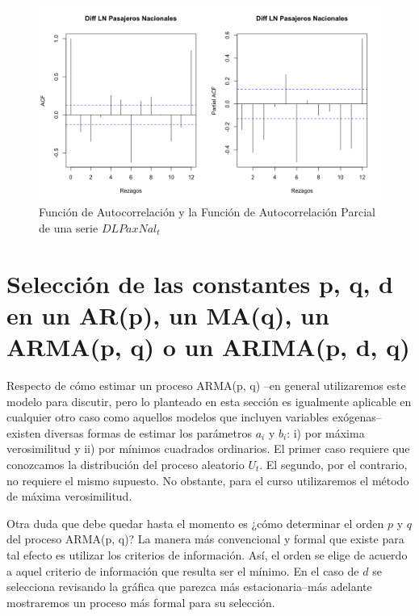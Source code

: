 \documentclass[
]{book}
\begin{document}
\begin{figure}

{\centering \includegraphics[width=0.95\linewidth]{Plots/G_ACF_PACF} 

}

\caption{Función de Autocorrelación y la Función de Autocorrelación Parcial de una serie $DLPaxNal_t$}\label{fig:fig414}
\end{figure}

\hypertarget{selecciuxf3n-de-las-constantes-p-q-d-en-un-arp-un-maq-un-armap-q-o-un-arimap-d-q}{%
\section{Selección de las constantes p, q, d en un AR(p), un MA(q), un ARMA(p, q) o un ARIMA(p, d, q)}\label{selecciuxf3n-de-las-constantes-p-q-d-en-un-arp-un-maq-un-armap-q-o-un-arimap-d-q}}

Respecto de cómo estimar un proceso ARMA(p, q) --en general utilizaremos este modelo para discutir, pero lo planteado en esta sección es igualmente aplicable en cualquier otro caso como aquellos modelos que incluyen variables exógenas-- existen diversas formas de estimar los parámetros \(a_i\) y \(b_i\): i) por máxima verosimilitud y ii) por mínimos cuadrados ordinarios. El primer caso requiere que conozcamos la distribución del proceso aleatorio \(U_t\). El segundo, por el contrario, no requiere el mismo supuesto. No obstante, para el curso utilizaremos el método de máxima verosimilitud.

Otra duda que debe quedar hasta el momento es ¿cómo determinar el orden \(p\) y \(q\) del proceso ARMA(p, q)? La manera más convencional y formal que existe para tal efecto es utilizar los criterios de información. Así, el orden se elige de acuerdo a aquel criterio de información que resulta ser el mínimo. En el caso de \(d\) se selecciona revisando la gráfica que parezca más estacionaria--más adelante mostraremos un proceso más formal para su selección.
\end{document}
